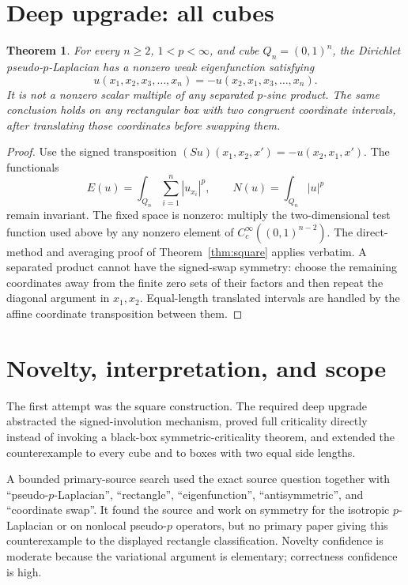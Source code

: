 \documentclass[11pt,a4paper]{article}
\newtheorem{theorem}{Theorem}
\begin{document}
\section{Deep upgrade: all cubes}

\begin{theorem}\label{thm:cube}
For every $n\ge2$, $1<p<\infty$, and cube $Q_n=(0,1)^n$, the Dirichlet
pseudo-$p$-Laplacian has a nonzero weak eigenfunction satisfying
\[
 u(x_1,x_2,x_3,\ldots,x_n)
 =-u(x_2,x_1,x_3,\ldots,x_n).
\]
It is not a nonzero scalar multiple of any separated $p$-sine product.
The same conclusion holds on any rectangular box with two congruent
coordinate intervals, after translating those coordinates before swapping
them.
\end{theorem}

\begin{proof}
Use the signed transposition
$(Su)(x_1,x_2,x')=-u(x_2,x_1,x')$.  The functionals
\[
 E(u)=\int_{Q_n}\sum_{i=1}^n|u_{x_i}|^p,
 \qquad N(u)=\int_{Q_n}|u|^p
\]
remain invariant.  The fixed space is nonzero: multiply the two-dimensional
test function used above by any nonzero element of
$C_c^\infty((0,1)^{n-2})$.  The direct-method and averaging proof of
Theorem~\ref{thm:square} applies verbatim.  A separated product cannot have
the signed-swap symmetry: choose the remaining coordinates away from the
finite zero sets of their factors and then repeat the diagonal argument in
$x_1,x_2$.  Equal-length translated intervals are handled by the affine
coordinate transposition between them.
\end{proof}

\section{Novelty, interpretation, and scope}

The first attempt was the square construction.  The required deep upgrade
abstracted the signed-involution mechanism, proved full criticality directly
instead of invoking a black-box symmetric-criticality theorem, and extended
the counterexample to every cube and to boxes with two equal side lengths.

A bounded primary-source search used the exact source question together with
``pseudo-$p$-Laplacian'', ``rectangle'', ``eigenfunction'',
``antisymmetric'', and ``coordinate swap''.  It found the source and work on
symmetry for the isotropic $p$-Laplacian or on nonlocal pseudo-$p$ operators,
but no primary paper giving this counterexample to the displayed rectangle
classification.  Novelty confidence is moderate because the variational
argument is elementary; correctness confidence is high.
\end{document}
